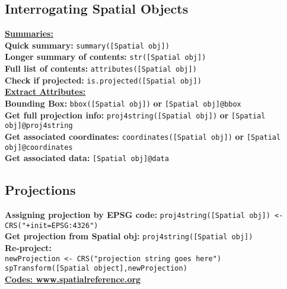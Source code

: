 \documentclass[10pt]{article}
\begin{document}
\hrulefill 
\subsection*{Interrogating Spatial Objects}
\underline{\textbf{Summaries:} }\\
\textbf{Quick summary:} \texttt{summary([Spatial obj])}\\
\textbf{Longer summary of contents:} \texttt{str([Spatial obj])}\\
\textbf{Full list of contents:} \texttt{attributes([Spatial obj])}\\
\textbf{Check if projected:} \texttt{is.projected([Spatial obj])}\\

\underline{\textbf{Extract Attributes:}}\\
\textbf{Bounding Box:} \texttt{bbox([Spatial obj])} \textbf{or} \texttt{[Spatial obj]@bbox}\\
\textbf{Get full projection info:} \texttt{proj4string([Spatial obj])} \textbf{or} \texttt{[Spatial obj]@proj4string}\\
\textbf{Get associated coordinates:} \texttt{coordinates([Spatial obj])} \textbf{or} \texttt{[Spatial obj]@coordinates}\\
\textbf{Get associated data:} \texttt{[Spatial obj]@data}\\


\hrulefill 
\subsection*{Projections}
\textbf{Assigning projection by EPSG code:} \texttt{proj4string([Spatial obj]) <-CRS("+init=EPSG:4326")}\\
\textbf{Get projection from Spatial obj:} \texttt{proj4string([Spatial obj])} \\
\textbf{Re-project:} \\
\hspace*{0.3cm}\texttt{newProjection <- CRS("projection string goes here")}\\
\hspace*{0.3cm}\texttt{spTransform([Spatial object],newProjection)}\\
\href{http://www.spatialreference.org/}{\underline{\textbf{Codes: www.spatialreference.org}}} \\

\end{document}
